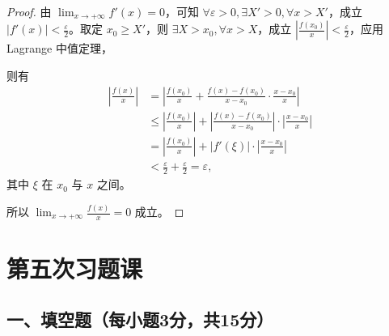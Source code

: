 \documentclass[lang=cn,12pt]{elegantbook}
\begin{document}
\begin{proof}
由 \(\lim_{x \to +\infty} f'(x) = 0\)，可知 \(\forall \varepsilon > 0, \exists X' > 0, \forall x > X'\)，成立 \(|f'(x)| < \frac{\varepsilon}{2}\)。取定 \(x_0 \geq X'\)，则 \(\exists X > x_0, \forall x > X\)，成立 \(\left| \frac{f(x_0)}{x} \right| < \frac{\varepsilon}{2}\)，应用 Lagrange 中值定理，

则有
\begin{align*}
\left| \frac{f(x)}{x} \right| 
&= \left| \frac{f(x_0)}{x} + \frac{f(x) - f(x_0)}{x - x_0} \cdot \frac{x - x_0}{x} \right| \\
&\leq \left| \frac{f(x_0)}{x} \right| + \left| \frac{f(x) - f(x_0)}{x - x_0} \right| \cdot \left| \frac{x - x_0}{x} \right| \\
&= \left| \frac{f(x_0)}{x} \right| + |f'(\xi)| \cdot \left| \frac{x - x_0}{x} \right| \\
&< \frac{\varepsilon}{2} + \frac{\varepsilon}{2} = \varepsilon,
\end{align*}
其中 \(\xi\) 在 \(x_0\) 与 \(x\) 之间。

所以 \(\lim_{x \to +\infty} \frac{f(x)}{x} = 0\) 成立。
\end{proof}


\chapter{第五次习题课}

\section*{一、填空题（每小题3分，共15分）}
\end{document}
